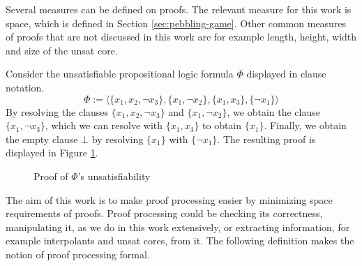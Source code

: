 Several measures can be defined on proofs.
The relevant measure for this work is space, which is defined in Section \ref{sec:pebbling-game}.
Other common measures of proofs that are not discussed in this work are for example length, height, width and size of the unsat core.


\begin{example}

Consider the unsatisfiable propositional logic formula $\Phi$ displayed in clause notation.
$$\Phi := {\langle \{x_1, x_2, \neg x_3\}, \{x_1, \neg x_2\}, \{x_1, x_3\}, \{\neg x_1\} \rangle}$$
By resolving the clauses $\{x_1, x_2, \neg x_3\}$ and $\{x_1, \neg x_2\}$, we obtain the clause $\{x_1,\neg x_3\}$, which we can resolve with $\{x_1, x_3\}$ to obtain $\{x_1\}$.
Finally, we obtain the empty clause $\bot$ by resolving $\{x_1\}$ with $\{\neg x_1\}$.
The resulting proof is displayed in Figure \ref{fig:resolutionexample}.

\begin{figure}[!h]


\caption{Proof of $\Phi$'s unsatisfiability}
\label{fig:resolutionexample}
\end{figure}


%

\end{example}

The aim of this work is to make proof processing easier by minimizing space requirements of proofs.
Proof processing could be checking its correctness, manipulating it, as we do in this work extensively, or extracting information, for example interpolants and unsat cores, from it.
The following definition makes the notion of proof processing formal.

